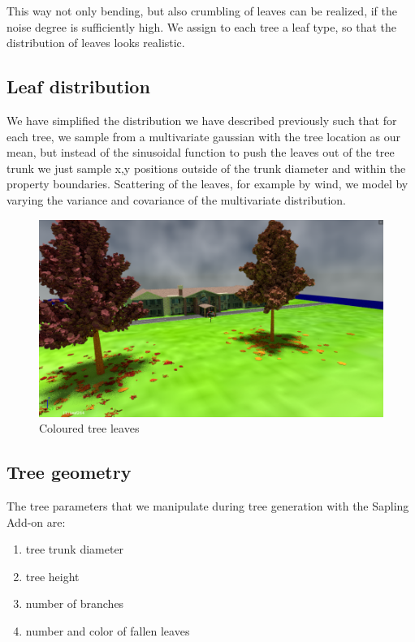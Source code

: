 \documentclass[fleqn,10pt]{SelfArx} %
\begin{document}
This way not only bending, but also crumbling of leaves can be realized, if the noise degree is sufficiently high. We assign to each tree a leaf type, so that the distribution of leaves looks realistic.

\subsection{Leaf distribution}

We have simplified the distribution we have described previously such that for each tree, we sample from a multivariate gaussian with the tree location as our mean, but instead of the sinusoidal function to push the leaves out of the tree trunk we just sample x,y positions outside of the trunk diameter and within the property boundaries. Scattering of the leaves, for example by wind, we model by varying the variance and covariance of the multivariate distribution.

\begin{figure}[ht]\centering
\includegraphics[width=\linewidth]{Figures/trees.png}
\caption{Coloured tree leaves}
\label{fig:trees}
\end{figure}

\subsection{Tree geometry}

The tree parameters that we manipulate during tree generation with the Sapling Add-on are:

\begin{enumerate}[nolistsep]
 \item tree trunk diameter
 \item tree height
 \item number of branches
 \item number and color of fallen leaves
\end{enumerate}
\end{document}
